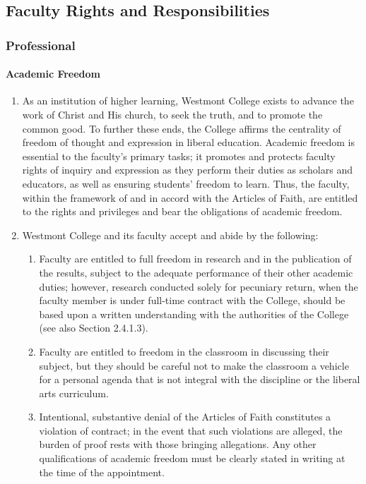 \documentclass[letterpaper, 11pt]{article}
\begin{document}
	\subsection{Faculty Rights and Responsibilities}
		\subsubsection{Professional}
			\paragraph{Academic Freedom}
				\begin{enumerate}[label=\alph*)]
					\item{As an institution of higher learning, Westmont College exists to advance the work of Christ and His church, to seek the truth, and to promote the common good.  To further these ends, the College affirms the centrality of freedom of thought and expression in liberal education.  Academic freedom is essential to the faculty's primary tasks; it promotes and protects faculty rights of inquiry and expression as they perform their duties as scholars and educators, as well as ensuring students' freedom to learn.  Thus, the faculty, within the framework of and in accord with the Articles of Faith, are entitled to the rights and privileges and bear the obligations of academic freedom.}
					\item{Westmont College and its faculty accept and abide by the following:
						\begin{enumerate}[label=\arabic*)]
							\item{Faculty are entitled to full freedom in research and in the publication of the results, subject to the adequate performance of their other academic duties; however, research conducted solely for pecuniary return, when the faculty member is under full-time contract with the College, should be based upon a written understanding with the authorities of the College (see also Section 2.4.1.3).}
							\item{Faculty are entitled to freedom in the classroom in discussing their subject, but they should be careful not to make the classroom a vehicle for a personal agenda that is not integral with the discipline or the liberal arts curriculum.}
							\item{Intentional, substantive denial of the Articles of Faith constitutes a violation of contract; in the event that such violations are alleged, the burden of proof rests with those bringing allegations.  Any other qualifications of academic freedom must be clearly stated in writing at the time of the appointment.}

\end{enumerate}}
\end{enumerate}
\end{document}
